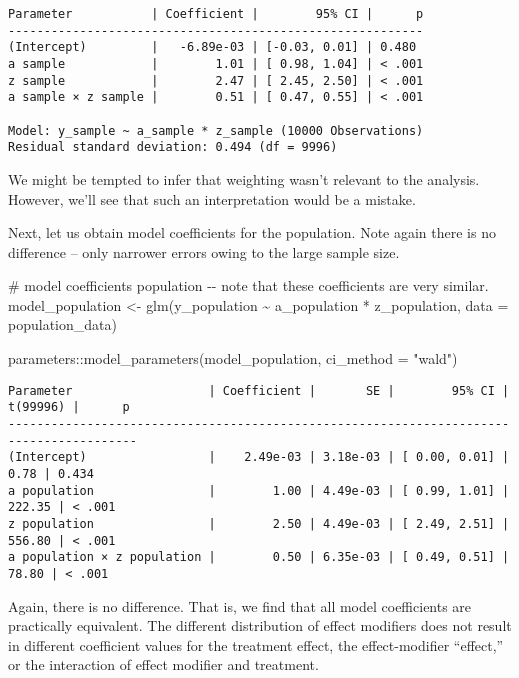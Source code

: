 \documentclass[
  singlecolumn]{article}
\newenvironment{Shaded}{\begin{snugshade}}{\end{snugshade}}
\newcommand{\AttributeTok}[1]{\textcolor[rgb]{0.40,0.45,0.13}{#1}}
\newcommand{\CommentTok}[1]{\textcolor[rgb]{0.37,0.37,0.37}{#1}}
\newcommand{\FunctionTok}[1]{\textcolor[rgb]{0.28,0.35,0.67}{#1}}
\newcommand{\NormalTok}[1]{\textcolor[rgb]{0.00,0.23,0.31}{#1}}
\newcommand{\OtherTok}[1]{\textcolor[rgb]{0.00,0.23,0.31}{#1}}
\newcommand{\SpecialCharTok}[1]{\textcolor[rgb]{0.37,0.37,0.37}{#1}}
\newcommand{\StringTok}[1]{\textcolor[rgb]{0.13,0.47,0.30}{#1}}
\begin{document}
\begin{verbatim}
Parameter           | Coefficient |        95% CI |      p
----------------------------------------------------------
(Intercept)         |   -6.89e-03 | [-0.03, 0.01] | 0.480 
a sample            |        1.01 | [ 0.98, 1.04] | < .001
z sample            |        2.47 | [ 2.45, 2.50] | < .001
a sample × z sample |        0.51 | [ 0.47, 0.55] | < .001

Model: y_sample ~ a_sample * z_sample (10000 Observations)
Residual standard deviation: 0.494 (df = 9996)
\end{verbatim}

We might be tempted to infer that weighting wasn't relevant to the
analysis. However, we'll see that such an interpretation would be a
mistake.

Next, let us obtain model coefficients for the population. Note again
there is no difference -- only narrower errors owing to the large sample
size.

\begin{Shaded}
\begin{Highlighting}[]
\CommentTok{\# model coefficients population {-}{-} note that these coefficients are very similar. }
\NormalTok{model\_population }\OtherTok{\textless{}{-}}
  \FunctionTok{glm}\NormalTok{(y\_population }\SpecialCharTok{\textasciitilde{}}\NormalTok{ a\_population }\SpecialCharTok{*}\NormalTok{ z\_population, }\AttributeTok{data =}\NormalTok{ population\_data)}

\NormalTok{parameters}\SpecialCharTok{::}\FunctionTok{model\_parameters}\NormalTok{(model\_population, }\AttributeTok{ci\_method =} \StringTok{"wald"}\NormalTok{)}
\end{Highlighting}
\end{Shaded}

\begin{verbatim}
Parameter                   | Coefficient |       SE |        95% CI | t(99996) |      p
----------------------------------------------------------------------------------------
(Intercept)                 |    2.49e-03 | 3.18e-03 | [ 0.00, 0.01] |     0.78 | 0.434 
a population                |        1.00 | 4.49e-03 | [ 0.99, 1.01] |   222.35 | < .001
z population                |        2.50 | 4.49e-03 | [ 2.49, 2.51] |   556.80 | < .001
a population × z population |        0.50 | 6.35e-03 | [ 0.49, 0.51] |    78.80 | < .001
\end{verbatim}

Again, there is no difference. That is, we find that all model
coefficients are practically equivalent. The different distribution of
effect modifiers does not result in different coefficient values for the
treatment effect, the effect-modifier ``effect,'' or the interaction of
effect modifier and treatment.
\end{document}
